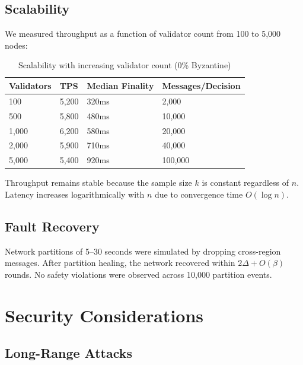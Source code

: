 \documentclass[11pt,a4paper]{article}
\begin{document}
\subsection{Scalability}

We measured throughput as a function of validator count from 100 to 5,000 nodes:

\begin{table}[h]
\centering
\caption{Scalability with increasing validator count (0\% Byzantine)}
\label{tab:scalability}
\begin{tabular}{@{}llll@{}}
\toprule
Validators & TPS & Median Finality & Messages/Decision \\
\midrule
100 & 5,200 & 320ms & 2,000 \\
500 & 5,800 & 480ms & 10,000 \\
1,000 & 6,200 & 580ms & 20,000 \\
2,000 & 5,900 & 710ms & 40,000 \\
5,000 & 5,400 & 920ms & 100,000 \\
\bottomrule
\end{tabular}
\end{table}

Throughput remains stable because the sample size $k$ is constant regardless of $n$. Latency
increases logarithmically with $n$ due to convergence time $O(\log n)$.

\subsection{Fault Recovery}

Network partitions of 5--30 seconds were simulated by dropping cross-region messages.
After partition healing, the network recovered within $2\Delta + O(\beta)$ rounds. No safety
violations were observed across 10,000 partition events.

\section{Security Considerations}
\label{sec:security}

\subsection{Long-Range Attacks}
\end{document}
